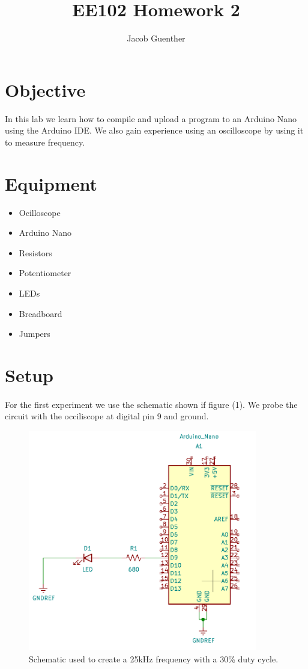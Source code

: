 \documentclass{article}
\title{EE102 Homework 2}
\author{Jacob Guenther}
\begin{document}


\section{Objective}
In this lab we learn how to compile and upload a program to an Arduino Nano using the Arduino IDE. We also gain experience using an oscilloscope by using it to measure frequency.

\section{Equipment}
\begin{itemize}
	\item Ocilloscope
	\item Arduino Nano
	\item Resistors
	\item Potentiometer
	\item LEDs
	\item Breadboard
	\item Jumpers
\end{itemize}

\section{Setup}

\paragraph{}
For the first experiment we use the schematic shown if figure (1). We probe the circuit with the occiliscope at digital pin 9 and ground.

\begin{figure}[H]
	\begin{center}
	\includegraphics[width=10cm]{schematic_led}
	\end{center}
	\caption{Schematic used to create a 25kHz frequency with a 30\% duty cycle.}
\end{figure}
\end{document}
